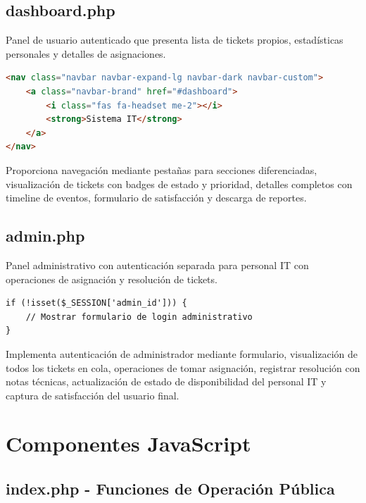 \documentclass[12pt,a4paper]{article}
\begin{document}
\subsection{dashboard.php}

Panel de usuario autenticado que presenta lista de tickets propios, estadísticas personales y detalles de asignaciones.

\begin{lstlisting}[language=HTML,caption={Estructura de navbar con navegación}]
<nav class="navbar navbar-expand-lg navbar-dark navbar-custom">
    <a class="navbar-brand" href="#dashboard">
        <i class="fas fa-headset me-2"></i>
        <strong>Sistema IT</strong>
    </a>
</nav>
\end{lstlisting}

Proporciona navegación mediante pestañas para secciones diferenciadas, visualización de tickets con badges de estado y prioridad, detalles completos con timeline de eventos, formulario de satisfacción y descarga de reportes.

\subsection{admin.php}

Panel administrativo con autenticación separada para personal IT con operaciones de asignación y resolución de tickets.

\begin{lstlisting}[language=HTML,caption={Verificación de login administrativo}]
if (!isset($_SESSION['admin_id'])) {
    // Mostrar formulario de login administrativo
}
\end{lstlisting}

Implementa autenticación de administrador mediante formulario, visualización de todos los tickets en cola, operaciones de tomar asignación, registrar resolución con notas técnicas, actualización de estado de disponibilidad del personal IT y captura de satisfacción del usuario final.

\newpage

\section{Componentes JavaScript}

\subsection{index.php - Funciones de Operación Pública}
\end{document}
